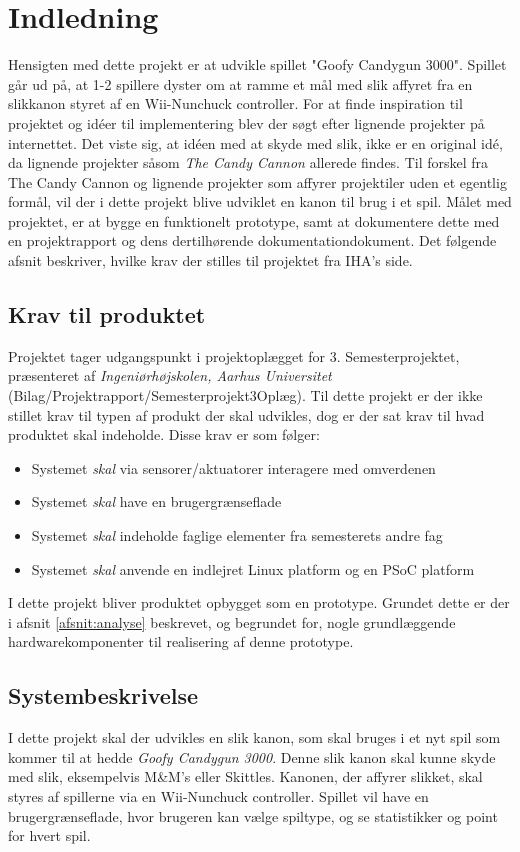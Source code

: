 \chapter{Indledning}
Hensigten med dette projekt er at udvikle spillet "Goofy Candygun 3000". Spillet går ud på, at 1-2 spillere dyster om at ramme et mål med slik affyret fra en slikkanon styret af en Wii-Nunchuck controller. For at finde inspiration til projektet og idéer til implementering blev der søgt efter lignende projekter på internettet. Det viste sig, at idéen med at skyde med slik, ikke er en original idé, da lignende projekter såsom \textit{The Candy Cannon} \cite{CandyCannon} allerede findes. Til forskel fra The Candy Cannon og lignende projekter som affyrer projektiler uden et egentlig formål, vil der i dette projekt blive udviklet en kanon til brug i et spil. 
Målet med projektet, er at bygge en funktionelt prototype, samt at dokumentere dette med en projektrapport og dens dertilhørende dokumentationdokument. 
Det følgende afsnit beskriver, hvilke krav der stilles til projektet fra IHA's side.

\section{Krav til produktet}
Projektet tager udgangspunkt i projektoplægget for 3. Semesterprojektet, præsenteret af \textit{Ingeniørhøjskolen, Aarhus Universitet} (Bilag/Projektrapport/Semesterprojekt3Oplæg). Til dette projekt er der ikke stillet krav til typen af produkt der skal udvikles, dog er der sat krav til hvad produktet skal indeholde. Disse krav er som følger:

\begin{itemize}
	\item{Systemet \textit{skal} via sensorer/aktuatorer interagere med omverdenen}
	\item{Systemet \textit{skal} have en brugergrænseflade}
	\item{Systemet \textit{skal} indeholde faglige elementer fra semesterets andre fag}
	\item{Systemet \textit{skal} anvende en indlejret Linux platform og en PSoC platform}
\end{itemize}

\noindent I dette projekt bliver produktet opbygget som en prototype. Grundet dette er der i afsnit \ref{afsnit:analyse} beskrevet, og begrundet for, nogle grundlæggende hardwarekomponenter til realisering af denne prototype.


\section{Systembeskrivelse}
\label{afsnit:systembeskrivelse}
I dette projekt skal der udvikles en slik kanon, som skal bruges i et nyt spil som kommer til at hedde \textit{Goofy Candygun 3000}. Denne slik kanon skal kunne skyde med slik, eksempelvis M\&M’s eller Skittles. Kanonen, der affyrer slikket, skal styres af spillerne via en Wii-Nunchuck controller. Spillet vil have en brugergrænseflade, hvor brugeren kan vælge spiltype, og se statistikker og point for hvert spil. \newline

